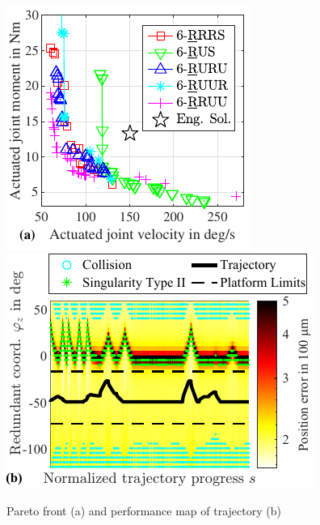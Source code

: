 \documentclass[runningheads]{llncs}
\begin{document}
% 
\begin{figure}[tb]
	\centering
	\vspace{-5mm}
	\includegraphics[trim=0 3 0 0]{pareto_all_actforceactvelo_small.pdf} %
	\hspace{0.4cm} %
	\includegraphics{perfmap_positionerror_obj_actforceactvelo_small.pdf}
	\caption{Pareto front (a) and performance map of trajectory (b)}
	\label{fig:synthesis_results}
	\vspace{-5mm}
\end{figure}
% 
% 
% 
\end{document}
